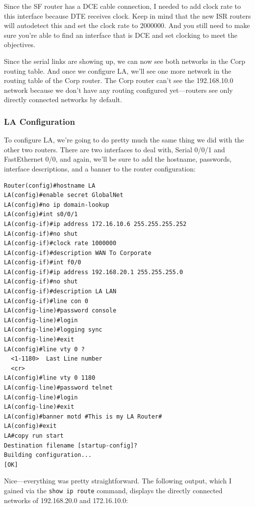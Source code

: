 Since the SF router has a DCE cable connection, I needed to add clock
rate to this interface because DTE receives clock. Keep in mind that the
new ISR routers will autodetect this and set the clock rate to 2000000.
And you still need to make sure you're able to find an interface that is
DCE and set clocking to meet the objectives.

Since the serial links are showing up, we can now see both networks in
the Corp routing table. And once we configure LA, we'll see one more
network in the routing table of the Corp router. The Corp router can't
see the 192.168.10.0 network because we don't have any routing
configured yet---routers see only directly connected networks by
default.

\subsubsection[LA
Configuration]{\texorpdfstring{\protect\hypertarget{c09.xhtmlux5cux23c09-sec-8}{}{}LA
Configuration}{LA Configuration}}

To configure LA, we're going to do pretty much the same thing we did
with the other two routers. There are two interfaces to deal with,
Serial 0/0/1 and FastEthernet 0/0, and again, we'll be sure to add the
hostname, passwords, interface descriptions, and a banner to the router
configuration:

\begin{verbatim}
Router(config)#hostname LA
LA(config)#enable secret GlobalNet
LA(config)#no ip domain-lookup
LA(config)#int s0/0/1
LA(config-if)#ip address 172.16.10.6 255.255.255.252
LA(config-if)#no shut
LA(config-if)#clock rate 1000000
LA(config-if)#description WAN To Corporate
LA(config-if)#int f0/0
LA(config-if)#ip address 192.168.20.1 255.255.255.0
LA(config-if)#no shut
LA(config-if)#description LA LAN
LA(config-if)#line con 0
LA(config-line)#password console
LA(config-line)#login
LA(config-line)#logging sync
LA(config-line)#exit
LA(config)#line vty 0 ?
  <1-1180>  Last Line number
  <cr>
LA(config)#line vty 0 1180
LA(config-line)#password telnet
LA(config-line)#login
LA(config-line)#exit
LA(config)#banner motd #This is my LA Router#
LA(config)#exit
LA#copy run start
Destination filename [startup-config]?
Building configuration...
[OK]
\end{verbatim}

Nice---everything was pretty straightforward. The following output,
which I gained via the \texttt{show\ ip\ route} command, displays the
directly connected networks of 192.168.20.0 and 172.16.10.0:


